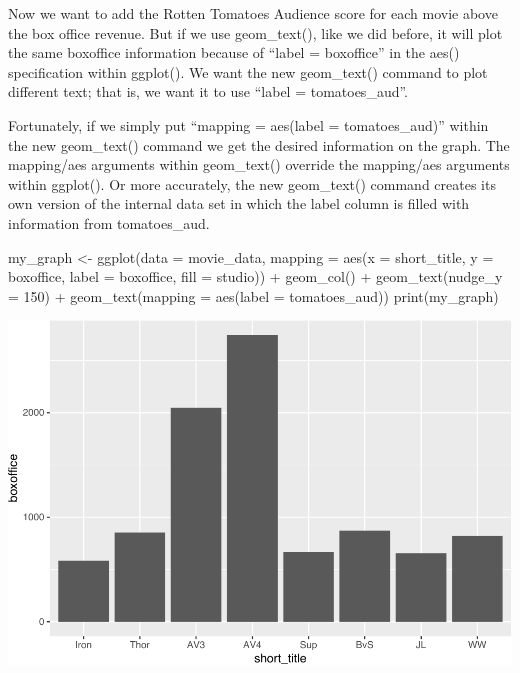 \documentclass[
]{krantz}
\makeatletter
\newenvironment{Shaded}{\begin{snugshade}}{\end{snugshade}}
\newcommand{\AttributeTok}[1]{\textcolor[rgb]{0.61,0.61,0.61}{#1}}
\newcommand{\DecValTok}[1]{\textcolor[rgb]{0.06,0.06,0.06}{#1}}
\newcommand{\FunctionTok}[1]{\textcolor[rgb]{0,0,0}{#1}}
\newcommand{\NormalTok}[1]{#1}
\newcommand{\OtherTok}[1]{\textcolor[rgb]{0.37,0.37,0.37}{#1}}
\newcommand{\SpecialCharTok}[1]{\textcolor[rgb]{0,0,0}{#1}}
\newenvironment{kframe}{%
\medskip{}
\setlength{\fboxsep}{.8em}
 \def\at@end@of@kframe{}%
 \ifinner\ifhmode%
  \def\at@end@of@kframe{\end{minipage}}%
  \begin{minipage}{\columnwidth}%
 \fi\fi%
 \def\FrameCommand##1{\hskip\@totalleftmargin \hskip-\fboxsep
 \colorbox{shadecolor}{##1}\hskip-\fboxsep
     \hskip-\linewidth \hskip-\@totalleftmargin \hskip\columnwidth}%
 \MakeFramed {\advance\hsize-\width
   \@totalleftmargin\z@ \linewidth\hsize
   \@setminipage}}%
 {\par\unskip\endMakeFramed%
 \at@end@of@kframe}
\renewenvironment{Shaded}{\begin{kframe}}{\end{kframe}}
\makeatother
\begin{document}
Now we want to add the Rotten Tomatoes Audience score for each movie above the box office revenue. But if we use geom\_text(), like we did before, it will plot the same boxoffice information because of ``label = boxoffice'' in the aes() specification within ggplot(). We want the new geom\_text() command to plot different text; that is, we want it to use ``label = tomatoes\_aud''.

Fortunately, if we simply put ``mapping = aes(label = tomatoes\_aud)'' within the new geom\_text() command we get the desired information on the graph. The mapping/aes arguments within geom\_text() override the mapping/aes arguments within ggplot(). Or more accurately, the new geom\_text() command creates its own version of the internal data set in which the label column is filled with information from tomatoes\_aud.

\begin{Shaded}
\begin{Highlighting}[]
\NormalTok{my\_graph }\OtherTok{\textless{}{-}} \FunctionTok{ggplot}\NormalTok{(}\AttributeTok{data =}\NormalTok{ movie\_data,}
           \AttributeTok{mapping =} \FunctionTok{aes}\NormalTok{(}\AttributeTok{x =}\NormalTok{ short\_title,}
                         \AttributeTok{y =}\NormalTok{ boxoffice,}
                         \AttributeTok{label =}\NormalTok{ boxoffice, }
                         \AttributeTok{fill =}\NormalTok{ studio)) }\SpecialCharTok{+}
  \FunctionTok{geom\_col}\NormalTok{() }\SpecialCharTok{+}
  \FunctionTok{geom\_text}\NormalTok{(}\AttributeTok{nudge\_y =} \DecValTok{150}\NormalTok{)  }\SpecialCharTok{+}
  \FunctionTok{geom\_text}\NormalTok{(}\AttributeTok{mapping =} \FunctionTok{aes}\NormalTok{(}\AttributeTok{label =}\NormalTok{ tomatoes\_aud)) }
\FunctionTok{print}\NormalTok{(my\_graph)}
\end{Highlighting}
\end{Shaded}

\includegraphics[width=0.65\linewidth]{bookdown_files/figure-latex/unnamed-chunk-106-1}
\end{document}

